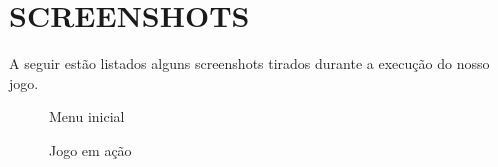 \documentclass[rel_mlp]{iiufrgs}
\begin{document}
%
\chapter{SCREENSHOTS}

A seguir estão listados alguns screenshots tirados durante a execução do nosso jogo.

\begin{figure}[htb]
    \centering
    \caption{Menu inicial}
    \label{fig:figura1}
\end{figure}

\begin{figure}[htb]
    \centering
    \caption{Jogo em ação}
    \label{fig:figura1}
\end{figure}
\end{document}
